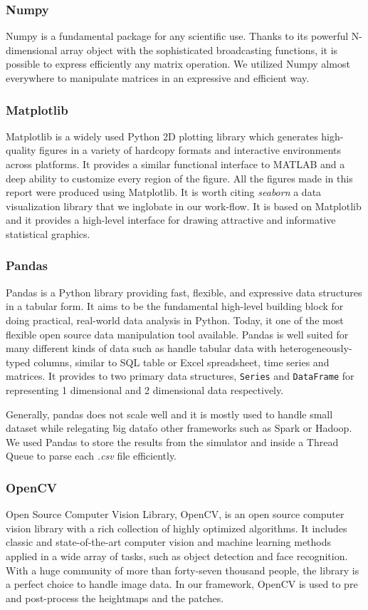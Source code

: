 \documentclass[../document.tex]{subfiles}
\begin{document}
\subsubsection{Numpy}
Numpy is a fundamental package for any scientific use. Thanks to its powerful N-dimensional array object with the sophisticated broadcasting functions, it is possible to express efficiently any matrix operation. We utilized Numpy almost everywhere to manipulate matrices in an expressive and efficient way.

\subsubsection{Matplotlib}
Matplotlib is a widely used Python 2D plotting library which generates high-quality figures in a variety of hardcopy formats and interactive environments across platforms. It provides a similar functional interface to MATLAB and a deep ability to customize every region of the figure. All the figures made in this report were produced using Matplotlib.
It is worth citing \emph{seaborn} a data visualization library that we inglobate in our work-flow. It is based on Matplotlib and it provides a high-level interface for drawing attractive and informative statistical graphics.
\subsubsection{Pandas}

Pandas is a Python library providing fast, flexible, and expressive data structures in a tabular form. It aims to be the fundamental high-level building block for doing practical, real-world data analysis in Python. Today, it one of the most flexible open source data manipulation tool available. Pandas is well suited for many different kinds of data such as handle tabular data with heterogeneously-typed columns, similar to SQL table or Excel spreadsheet, time series and matrices. It provides to two primary data structures, \texttt{Series} and \texttt{DataFrame} for representing 1 dimensional and 2 dimensional  data respectively.  

Generally, pandas does not scale well and it is mostly used to handle small dataset while relegating \"big data\" to other frameworks such as Spark or Hadoop. We used Pandas to store the results from the simulator and inside a Thread Queue to parse each \emph{.csv} file efficiently. 
\subsubsection{OpenCV}
Open Source Computer Vision Library, OpenCV, is an open source computer vision library with a rich collection of highly optimized algorithms. It includes classic and state-of-the-art computer vision and machine learning methods applied in a wide array of tasks, such as object detection and face recognition.
 With a huge community of more than forty-seven thousand people, the library is a perfect choice to handle image data. 
In our framework, OpenCV is used to pre and post-process the heightmaps and the patches.
\end{document}
